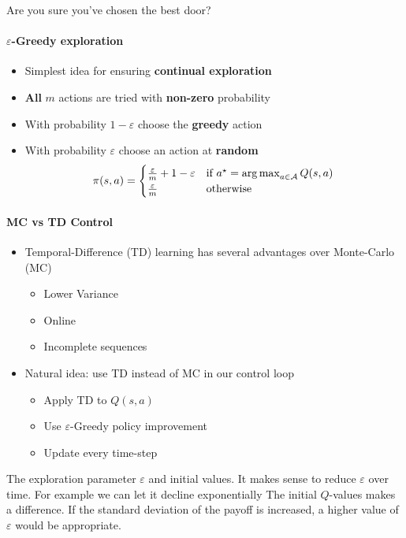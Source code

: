 Are you sure you've chosen the best door?

\paragraph{$\varepsilon$-Greedy exploration}

\begin{itemize}
    \item Simplest idea for ensuring \textbf{continual exploration}
    \item \textbf{All} $m$ actions are tried with \textbf{non-zero} probability
    \item With probability $1-\varepsilon$ choose the \textbf{greedy} action
    \item With probability $\varepsilon$ choose an action at \textbf{random}
    \[
    \pi(s, a)= \begin{cases}\frac{\varepsilon}{m}+1-\varepsilon & \text {if } a^{\star}=\operatorname*{arg\,max} _{a \in \mathcal{A}} Q(s, a) \\ \frac{\varepsilon}{m} & \text {otherwise}\end{cases}
    \]
\end{itemize}


\paragraph{MC vs TD Control}
\begin{itemize}
    \item Temporal-Difference (TD) learning has several advantages over Monte-Carlo (MC)
    \begin{itemize}
        \item Lower Variance
        \item Online
        \item Incomplete sequences
    \end{itemize}
    \item Natural idea: use TD instead of MC in our control loop
    \begin{itemize}
        \item Apply TD to $Q(s, a)$
        \item Use $\varepsilon$-Greedy policy improvement
        \item Update every time-step
    \end{itemize}
\end{itemize}

The exploration parameter $\varepsilon$ and initial values. It makes sense to reduce $\varepsilon$ over time. For example we can let it decline exponentially
The initial $Q$-values makes a difference.
If the standard deviation of the payoff is increased, a higher value of $\varepsilon$ would be appropriate.

